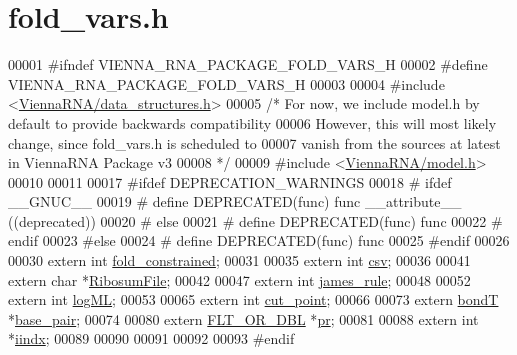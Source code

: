 \hypertarget{fold__vars_8h_source}{}\section{fold\+\_\+vars.\+h}
\label{fold__vars_8h_source}

\begin{DoxyCode}
00001 \textcolor{preprocessor}{#ifndef VIENNA\_RNA\_PACKAGE\_FOLD\_VARS\_H}
00002 \textcolor{preprocessor}{#define VIENNA\_RNA\_PACKAGE\_FOLD\_VARS\_H}
00003 
00004 \textcolor{preprocessor}{#include <\hyperlink{data__structures_8h}{ViennaRNA/data\_structures.h}>}
00005 \textcolor{comment}{/*  For now, we include model.h by default to provide backwards compatibility}
00006 \textcolor{comment}{    However, this will most likely change, since fold\_vars.h is scheduled to}
00007 \textcolor{comment}{    vanish from the sources at latest in ViennaRNA Package v3}
00008 \textcolor{comment}{*/}
00009 \textcolor{preprocessor}{#include <\hyperlink{model_8h}{ViennaRNA/model.h}>}
00010 
00011 
00017 \textcolor{preprocessor}{#ifdef DEPRECATION\_WARNINGS}
00018 \textcolor{preprocessor}{# ifdef \_\_GNUC\_\_}
00019 \textcolor{preprocessor}{#  define DEPRECATED(func) func \_\_attribute\_\_ ((deprecated))}
00020 \textcolor{preprocessor}{# else}
00021 \textcolor{preprocessor}{#  define DEPRECATED(func) func}
00022 \textcolor{preprocessor}{# endif}
00023 \textcolor{preprocessor}{#else}
00024 \textcolor{preprocessor}{# define DEPRECATED(func) func}
00025 \textcolor{preprocessor}{#endif}
00026 
00030 \textcolor{keyword}{extern} \textcolor{keywordtype}{int}    \hyperlink{fold__vars_8h_a0afc287c2464866d94858c39175154af}{fold\_constrained};
00031 
00035 \textcolor{keyword}{extern} \textcolor{keywordtype}{int}  \hyperlink{fold__vars_8h_af2763d55a74663a5e60652b8880baa5b}{csv};
00036 
00041 \textcolor{keyword}{extern} \textcolor{keywordtype}{char} *\hyperlink{fold__vars_8h_a5dbaa0cca2c8c82048a0f0e38e164944}{RibosumFile};   
00042 
00047 \textcolor{keyword}{extern} \textcolor{keywordtype}{int}  \hyperlink{fold__vars_8h_af349001ad3b4d008d0051d935b1b6261}{james\_rule};
00048 
00052 \textcolor{keyword}{extern} \textcolor{keywordtype}{int}  \hyperlink{fold__vars_8h_a80c3c5fd35e7479704cc91d2d0367743}{logML};
00053 
00065 \textcolor{keyword}{extern} \textcolor{keywordtype}{int}  \hyperlink{fold__vars_8h_ab9b2c3a37a5516614c06d0ab54b97cda}{cut\_point};
00066 
00073 \textcolor{keyword}{extern} \hyperlink{group__data__structures_structvrna__bp__stack__s}{bondT}  *\hyperlink{fold__vars_8h_a0244a629b5ab4f58b77590c3dfd130dc}{base\_pair};
00074 
00080 \textcolor{keyword}{extern} \hyperlink{group__data__structures_ga31125aeace516926bf7f251f759b6126}{FLT\_OR\_DBL} *\hyperlink{fold__vars_8h_ac98ec419070aee6831b44e5c700f090f}{pr};
00081 
00088 \textcolor{keyword}{extern} \textcolor{keywordtype}{int}   *\hyperlink{fold__vars_8h_a92089ae3a51b5d75a14ce9cc29cc8317}{iindx};
00089 
00090 
00091 
00092 
00093 \textcolor{preprocessor}{#endif}
\end{DoxyCode}
